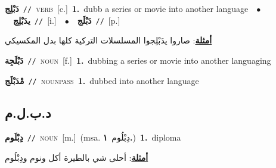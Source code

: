 \documentclass[10pt,a4paper,twoside]{article} %
\begin{document}
\begin{multicols}{2}
{{{{{{\setlength\topsep{0pt}\textbf{\foreignlanguage{arabic}{دَبْلِج}}\ {\color{gray}\texttt{//}\color{black}}\ \textsc{verb}\ [c.]\ \textbf{1.}~dubb a series or movie into another language\ \ $\bullet$\ \ \setlength\topsep{0pt}\textbf{\foreignlanguage{arabic}{يدَبْلِج}}\ {\color{gray}\texttt{//}\color{black}}\ [i.]\ \ $\bullet$\ \ \setlength\topsep{0pt}\textbf{\foreignlanguage{arabic}{دَبْلَج}}\ {\color{gray}\texttt{//}\color{black}}\ [p.]\  \begin{flushright}\color{gray}\foreignlanguage{arabic}{\textbf{\underline{\foreignlanguage{arabic}{أمثلة}}}: صاروا يدَبْلِجوا المسلسلات التركية كلها بدل المكسيكي}\end{flushright}\color{black}} \vspace{2mm}

{\setlength\topsep{0pt}\textbf{\foreignlanguage{arabic}{دَبْلَجِة}}\ {\color{gray}\texttt{//}\color{black}}\ \textsc{noun}\ [f.]\ \textbf{1.}~dubbing a series or movie into another languaging\ 

{\setlength\topsep{0pt}\textbf{\foreignlanguage{arabic}{مْدَبْلَج}}\ {\color{gray}\texttt{//}\color{black}}\ \textsc{noun\textunderscore pass}\ \textbf{1.}~dubbed into another language\ 

\vspace{-3mm}
\subsection*{\color{blue}\foreignlanguage{arabic}{د.ب.ل.م}\color{blue}{ (ntws)}} 

{\setlength\topsep{0pt}\textbf{\foreignlanguage{arabic}{دِبْلَوم}}\ {\color{gray}\texttt{//}\color{black}}\ \textsc{noun}\ [m.]\ \color{gray}(msa. \foreignlanguage{arabic}{دِبْلُوم}~\foreignlanguage{arabic}{\textbf{١.}})\color{black}\ \textbf{1.}~diploma\  \begin{flushright}\color{gray}\foreignlanguage{arabic}{\textbf{\underline{\foreignlanguage{arabic}{أمثلة}}}: أحلى شي بالطيرة أكل ونوم ودِبْلُوم}\end{flushright}\color{black}} \vspace{2mm}

}}}}}}}
\end{multicols}
\end{document}
